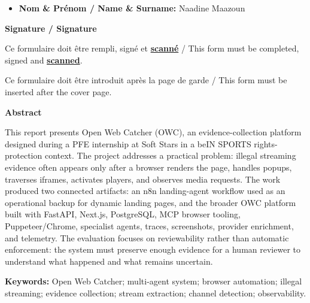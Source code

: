 \documentclass[12pt,a4paper,twoside]{report}
\newenvironment{abstractresumeblock}[1]{%
  \par\vspace{0.72em}%
  \begin{center}%
  {\bfseries\fontsize{13.0}{16.0}\selectfont #1\par}%
  \vspace{0.28em}%
  \begin{minipage}{0.80\textwidth}%
  \small\setlength{\parindent}{0pt}\setlength{\parskip}{0.34em}%
  \setstretch{1.08}%
}{%
  \end{minipage}%
  \end{center}\par\vspace{0.28em}%
}
\newcommand{\supervisorName}{Naadine Maazoun}
\begin{document}
{\begin{center}
{\begin{minipage}{14cm}
\begin{itemize}
  \item \textbf{Nom \& Pr\'enom / Name \& Surname:} \supervisorName{}
\end{itemize}

\vspace{0.3cm}
\begin{center}
\textbf{Signature / Signature}
\end{center}

\vspace{3.5cm}
\end{minipage}%
}
\end{center}

\vspace{0.8cm}
Ce formulaire doit \^etre rempli, sign\'e et \underline{\textbf{scann\'e}} / This form must be completed, signed and \underline{\textbf{scanned}}.

Ce formulaire doit \^etre introduit apr\`es la page de garde / This form must be inserted after the cover page.
}
\newpage
\fi

\hypersetup{pageanchor=true}

\clearpage
{}
{}
\thispagestyle{plain}
\vspace*{0.18cm}
\begin{abstractresumeblock}{Abstract}
This report presents Open Web Catcher (OWC), an evidence-collection platform designed during a PFE internship at Soft Stars in a beIN SPORTS rights-protection context. The project addresses a practical problem: illegal streaming evidence often appears only after a browser renders the page, handles popups, traverses iframes, activates players, and observes media requests. The work produced two connected artifacts: an n8n landing-agent workflow used as an operational backup for dynamic landing pages, and the broader OWC platform built with FastAPI, Next.js, PostgreSQL, MCP browser tooling, Puppeteer/Chrome, specialist agents, traces, screenshots, provider enrichment, and telemetry. The evaluation focuses on reviewability rather than automatic enforcement: the system must preserve enough evidence for a human reviewer to understand what happened and what remains uncertain.
\par\smallskip
\textbf{Keywords:} Open Web Catcher; multi-agent system; browser automation; illegal streaming; evidence collection; stream extraction; channel detection; observability.
\end{abstractresumeblock}
\end{document}
